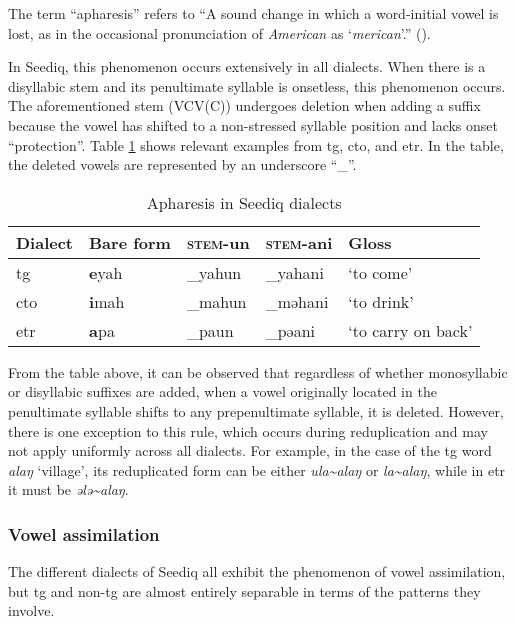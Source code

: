 The term ``apharesis'' refers to ``A sound change in which a word-initial vowel is lost, as in the occasional pronunciation of \textit{American} as `\textit{merican}'.'' (\cite[13]{campbell2007HLglossary}).

In Seediq, this phenomenon occurs extensively in all dialects. When there is a disyllabic stem and its penultimate syllable is onsetless, this phenomenon occurs. The aforementioned stem (VCV(C)) undergoes deletion when adding a suffix because the vowel has shifted to a non-stressed syllable position and lacks onset ``protection''. Table \ref{tab:apharesis} shows relevant examples from \acl{tg}, \acl{cto}, and \acl{etr}. In the table, the deleted vowels are represented by an underscore ``\_''.

\begin{table}[!htbp]
\centering
\caption{Apharesis in Seediq dialects}
\label{tab:apharesis}
\begin{tabular}{lllll}
\hline
Dialect   & Bare form & \textsc{stem}-un & \textsc{stem}-ani & Gloss              \\ \hline
\acl{tg}  & \textbf{e}yah      & \_yahun          & \_yahani          & `to come'          \\
\acl{cto} & \textbf{i}mah      & \_mahun          & \_məhani          & `to drink'         \\
\acl{etr} & \textbf{a}pa       & \_paun           & \_pəani           & `to carry on back' \\ \hline
\end{tabular}
\end{table}

From the table above, it can be observed that regardless of whether monosyllabic or disyllabic suffixes are added, when a vowel originally located in the penultimate syllable shifts to any prepenultimate syllable, it is deleted. However, there is one exception to this rule, which occurs during reduplication and may not apply uniformly across all dialects. For example, in the case of the \acl{tg} word \textit{alaŋ} `village', its reduplicated form can be either \textit{ula\~{}alaŋ} or \textit{la\~{}alaŋ}, while in \acl{etr} it must be \textit{ələ\~{}alaŋ}.


\subsubsection{Vowel assimilation} \label{sec:vassim}

The different dialects of Seediq all exhibit the phenomenon of vowel assimilation, but \acl{tg} and non-\acl{tg} are almost entirely separable in terms of the patterns they involve. 

